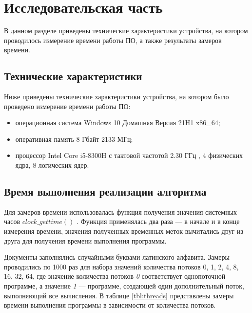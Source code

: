 \chapter{Исследовательская часть}

В данном разделе приведены технические характеристики устройства, на котором проводилось измерение времени работы ПО, а также результаты замеров времени.

\section{Технические характеристики}

Ниже приведены технические характеристики устройства, на котором было проведено измерение времени работы ПО:

\begin{itemize}
	\item операционная система Windows 10 Домашняя Версия 21H1 \cite{windows} x86\_64;
	\item оперативная память 8 Гбайт 2133 МГц;
	\item процессор Intel Core i5-8300H с тактовой частотой 2.30 ГГц \cite{intel}, 4 физических ядра, 8 логических ядер.
\end{itemize}

\section{Время выполнения реализации алгоритма}

Для замеров времени использовалась функция получения значения системных часов $clock\_gettime()$ \cite{gettime}. Функция применялась два раза --- в начале и в конце измерения времени, значения полученных временных меток вычитались друг из друга для получения времени выполнения программы.

Документы заполнялись случайными буквами латинского алфавита.
Замеры проводились по 1000 раз для набора значений количества потоков {0, 1, 2, 4, 8, 16, 32, 64}, где значение количества потоков \textit{0} соответствует однопоточной программе, а значение \textit{1} --- программе, создающей один дополнительный поток, выполняющий все вычисления.
В таблице \ref{tbl:threads} представлены замеры времени выполнения программы в зависимости от количества потоков.


